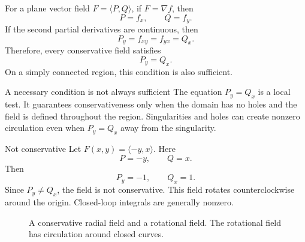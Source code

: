 \documentclass[11pt,oneside]{book}
\newcommand{\grad}{\nabla}
\begin{document}
For a plane vector field $F=\langle P,Q\rangle$, if $F=\grad f$, then
\[
P=f_x,\qquad Q=f_y.
\]
If the second partial derivatives are continuous, then
\[
P_y=f_{xy}=f_{yx}=Q_x.
\]
Therefore, every conservative field satisfies
\[
P_y=Q_x.
\]
On a simply connected region, this condition is also sufficient.

\begin{warningbox}{A necessary condition is not always sufficient}
The equation $P_y=Q_x$ is a local test. It guarantees conservativeness only when the domain has no holes and the field is defined throughout the region. Singularities and holes can create nonzero circulation even when $P_y=Q_x$ away from the singularity.
\end{warningbox}

\begin{examplebox}{Not conservative}
Let $F(x,y)=\langle -y,x\rangle$. Here
\[
P=-y,\qquad Q=x.
\]
Then
\[
P_y=-1,\qquad Q_x=1.
\]
Since $P_y\ne Q_x$, the field is not conservative. This field rotates counterclockwise around the origin. Closed-loop integrals are generally nonzero.
\end{examplebox}

\begin{figure}[H]
\centering
{}
\caption{A conservative radial field and a rotational field. The rotational field has circulation around closed curves.}
\end{figure}
\end{document}
